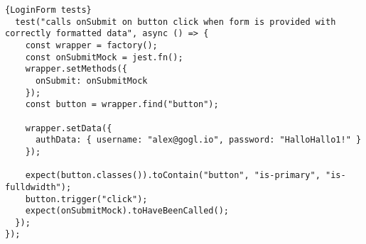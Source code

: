\begin{lstlisting}[caption=LoginForm tests, captionpos=b, style=htmlcssjs, label=loginformtest]{LoginForm tests}
  test("calls onSubmit on button click when form is provided with correctly formatted data", async () => {
    const wrapper = factory();
    const onSubmitMock = jest.fn();
    wrapper.setMethods({
      onSubmit: onSubmitMock
    });
    const button = wrapper.find("button");

    wrapper.setData({
      authData: { username: "alex@gogl.io", password: "HalloHallo1!" }
    });

    expect(button.classes()).toContain("button", "is-primary", "is-fulldwidth");
    button.trigger("click");
    expect(onSubmitMock).toHaveBeenCalled();
  });
});

\end{lstlisting}